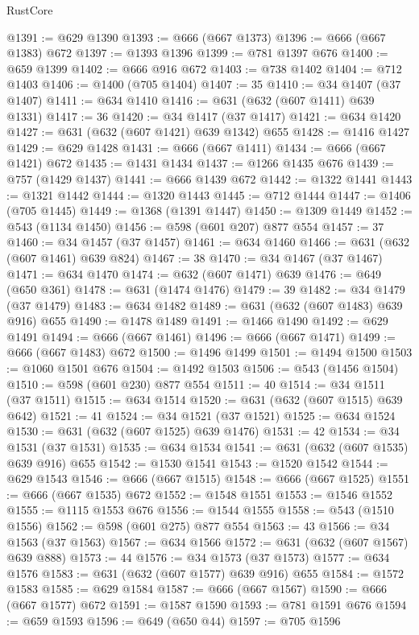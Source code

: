 \begin{lexlean}{RustCore}
\begin{coremodule}
@1391 := @629 @1390
@1393 := @666 (@667 @1373)
@1396 := @666 (@667 @1383) @672
@1397 := @1393 @1396
@1399 := @781 @1397 @676
@1400 := @659 @1399
@1402 := @666 @916 @672
@1403 := @738 @1402
@1404 := @712 @1403
@1406 := @1400 (@705 @1404)
@1407 := 35
@1410 := @34 @1407 (@37 @1407)
@1411 := @634 @1410
@1416 := @631 (@632 (@607 @1411) @639 @1331)
@1417 := 36
@1420 := @34 @1417 (@37 @1417)
@1421 := @634 @1420
@1427 := @631 (@632 (@607 @1421) @639 @1342) @655
@1428 := @1416 @1427
@1429 := @629 @1428
@1431 := @666 (@667 @1411)
@1434 := @666 (@667 @1421) @672
@1435 := @1431 @1434
@1437 := @1266 @1435 @676
@1439 := @757 (@1429 @1437)
@1441 := @666 @1439 @672
@1442 := @1322 @1441
@1443 := @1321 @1442
@1444 := @1320 @1443
@1445 := @712 @1444
@1447 := @1406 (@705 @1445)
@1449 := @1368 (@1391 @1447)
@1450 := @1309 @1449
@1452 := @543 (@1134 @1450)
@1456 := @598 (@601 @207) @877 @554
@1457 := 37
@1460 := @34 @1457 (@37 @1457)
@1461 := @634 @1460
@1466 := @631 (@632 (@607 @1461) @639 @824)
@1467 := 38
@1470 := @34 @1467 (@37 @1467)
@1471 := @634 @1470
@1474 := @632 (@607 @1471) @639
@1476 := @649 (@650 @361)
@1478 := @631 (@1474 @1476)
@1479 := 39
@1482 := @34 @1479 (@37 @1479)
@1483 := @634 @1482
@1489 := @631 (@632 (@607 @1483) @639 @916) @655
@1490 := @1478 @1489
@1491 := @1466 @1490
@1492 := @629 @1491
@1494 := @666 (@667 @1461)
@1496 := @666 (@667 @1471)
@1499 := @666 (@667 @1483) @672
@1500 := @1496 @1499
@1501 := @1494 @1500
@1503 := @1060 @1501 @676
@1504 := @1492 @1503
@1506 := @543 (@1456 @1504)
@1510 := @598 (@601 @230) @877 @554
@1511 := 40
@1514 := @34 @1511 (@37 @1511)
@1515 := @634 @1514
@1520 := @631 (@632 (@607 @1515) @639 @642)
@1521 := 41
@1524 := @34 @1521 (@37 @1521)
@1525 := @634 @1524
@1530 := @631 (@632 (@607 @1525) @639 @1476)
@1531 := 42
@1534 := @34 @1531 (@37 @1531)
@1535 := @634 @1534
@1541 := @631 (@632 (@607 @1535) @639 @916) @655
@1542 := @1530 @1541
@1543 := @1520 @1542
@1544 := @629 @1543
@1546 := @666 (@667 @1515)
@1548 := @666 (@667 @1525)
@1551 := @666 (@667 @1535) @672
@1552 := @1548 @1551
@1553 := @1546 @1552
@1555 := @1115 @1553 @676
@1556 := @1544 @1555
@1558 := @543 (@1510 @1556)
@1562 := @598 (@601 @275) @877 @554
@1563 := 43
@1566 := @34 @1563 (@37 @1563)
@1567 := @634 @1566
@1572 := @631 (@632 (@607 @1567) @639 @888)
@1573 := 44
@1576 := @34 @1573 (@37 @1573)
@1577 := @634 @1576
@1583 := @631 (@632 (@607 @1577) @639 @916) @655
@1584 := @1572 @1583
@1585 := @629 @1584
@1587 := @666 (@667 @1567)
@1590 := @666 (@667 @1577) @672
@1591 := @1587 @1590
@1593 := @781 @1591 @676
@1594 := @659 @1593
@1596 := @649 (@650 @44)
@1597 := @705 @1596

\end{coremodule}
\end{lexlean}
